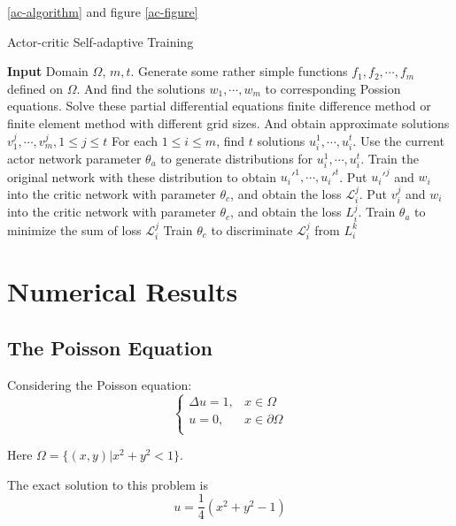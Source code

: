 \documentclass{article}
\begin{document}
\ref{ac-algorithm} and figure \ref{ac-figure}
\begin{algorithm}
	\caption{Actor-critic Self-adaptive Training}
	\label{ac-algorithm}
	\begin{algorithmic}[1]
		\State\textbf{Input} Domain $\Omega$, $m, t$.
		\State Generate some rather simple functions $f_1, f_{2}, \cdots, f_{m}$ defined on $\Omega$. And find the solutions $w_{1}, \cdots, w_{m}$ to corresponding Possion equations.
		\State Solve these partial differential equations finite difference method or finite element method with different grid sizes. And obtain approximate solutions $v_{1}^{j}, \cdots, v_{m}^{j}, 1\le j\le t$
		\State For each $1\le i\le m$, find $t$ solutions $u_{i}^{1}, \cdots, u_{i}^{t}$.
		\State Use the current actor network parameter $\theta_{a}$ to generate distributions for $u_{i}^{1}, \cdots, u_{i}^{t}$.
		\State Train the original network with these distribution to obtain $u_{i}'^{1}, \cdots, u_{i}'^{t}$.
		\State Put $u_{i}'^{j}$ and $w_{i}$ into the critic network with parameter $\theta_{c}$, and obtain the loss $\mathcal{L}_{i}^{j}$.
		\State Put $v_{i}^{j}$ and $w_{i}$ into the critic network with parameter $\theta_{c}$, and obtain the loss $L_{i}^{j}$.
		\State Train $\theta_{a}$ to minimize the sum of loss $\mathcal{L}_{i}^{j}$
		\State Train $\theta_{c}$ to discriminate $\mathcal{L}_{i}^{j}$ from $L_{i}^{k}$
 	\end{algorithmic}
\end{algorithm}



\section{Numerical Results}

\subsection{The Poisson Equation}
\par Considering the Poisson equation:
\begin{equation}
\left\{
\begin{aligned}
 \Delta u=1,& x\in \Omega \\
 u=0, &x\in \partial \Omega \\
 \end{aligned}
\right.
\end{equation}

Here $\Omega =\{(x,y)| x^2+y^2<1\}$.
\par The exact solution to this problem is 
\begin{equation}
u=\frac{1}{4}(x^2+y^2-1)
\end{equation}
\end{document}

